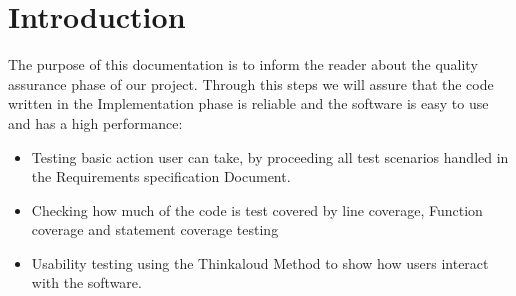 \section{Introduction}
The purpose of this documentation is to inform the reader about the quality assurance phase of our project. Through this steps we will assure that the code written in the Implementation phase is reliable and the software is easy to use and has a high performance:
\begin{itemize}
    \item Testing basic action user can take, by proceeding all test scenarios handled in the Requirements specification Document. 
    \item Checking how much of the code is test covered by line coverage, Function coverage and statement coverage testing
    \item Usability testing using the Thinkaloud Method to show how users interact with the software.
\end{itemize}